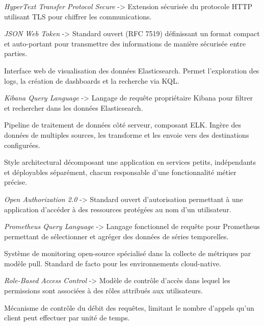 \documentclass[12pt, a4paper]{report}
\begin{document}
\begin{description}[leftmargin=3.5cm, style=nextline]
  \item[HTTPS] \textit{HyperText Transfer Protocol Secure} -> Extension sécurisée du protocole HTTP utilisant TLS pour chiffrer les communications.

  \item[JWT] \textit{JSON Web Token} -> Standard ouvert (RFC 7519) définissant un format compact et auto-portant pour transmettre des informations de manière sécurisée entre parties.

  \item[Kibana] Interface web de visualisation des données Elasticsearch. Permet l'exploration des logs, la création de dashboards et la recherche via KQL.

  \item[KQL] \textit{Kibana Query Language} -> Langage de requête propriétaire Kibana pour filtrer et rechercher dans les données Elasticsearch.

  \item[Logstash] Pipeline de traitement de données côté serveur, composant ELK. Ingère des données de multiples sources, les transforme et les envoie vers des destinations configurées.

  \item[Microservice] Style architectural décomposant une application en services petits, indépendants et déployables séparément, chacun responsable d'une fonctionnalité métier précise.

  \item[OAuth2] \textit{Open Authorization 2.0} -> Standard ouvert d'autorisation permettant à une application d'accéder à des ressources protégées au nom d'un utilisateur.

  \item[PromQL] \textit{Prometheus Query Language} -> Langage fonctionnel de requête pour Prometheus permettant de sélectionner et agréger des données de séries temporelles.

  \item[Prometheus] Système de monitoring open-source spécialisé dans la collecte de métriques par modèle pull. Standard de facto pour les environnements cloud-native.

  \item[RBAC] \textit{Role-Based Access Control} -> Modèle de contrôle d'accès dans lequel les permissions sont associées à des rôles attribués aux utilisateurs.

  \item[Rate Limiting] Mécanisme de contrôle du débit des requêtes, limitant le nombre d'appels qu'un client peut effectuer par unité de temps.


\end{description}
\end{document}
